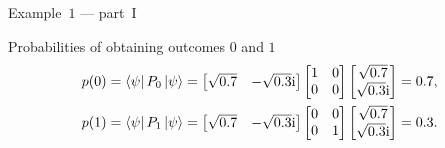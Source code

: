 \begin{frame}{Example~$1$ --- part~I}
            \begin{block}{Probabilities of obtaining outcomes $0$ and $1$}
                \vspace{-0.4cm}
                \begin{equation*}
                    \begin{split}
                        p(0) &= \bra{\psi} P_0 \ket{\psi} = 
                        \begin{bmatrix}
                            \sqrt{0.7} & -\sqrt{0.3} \mathrm{i}
                        \end{bmatrix}
                        \begin{bmatrix}
                            1 & 0\\
                            0 & 0
                        \end{bmatrix}
                        \begin{bmatrix}
                            \sqrt{0.7} \\
                            \sqrt{0.3} \mathrm{i}
                        \end{bmatrix}
                        = 0.7,  \\
                        p(1) &= \bra{\psi} P_1 \ket{\psi} = 
                        \begin{bmatrix}
                            \sqrt{0.7} & -\sqrt{0.3}\mathrm{i}
                        \end{bmatrix}
                        \begin{bmatrix}
                            0 & 0\\
                            0 & 1
                        \end{bmatrix}
                        \begin{bmatrix}
                            \sqrt{0.7} \\
                            \sqrt{0.3}\mathrm{i}
                        \end{bmatrix}
                        = 0.3.
                    \end{split}
                \end{equation*}
            \end{block}
        \end{frame}
